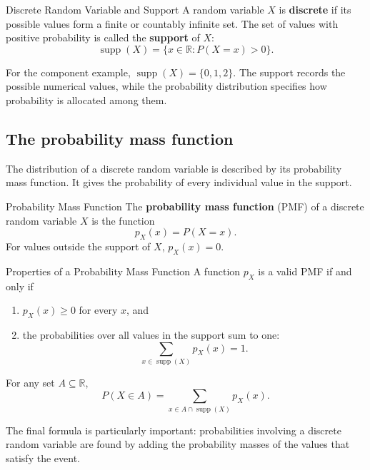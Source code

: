 \begin{definition}{Discrete Random Variable and Support}
    A random variable $X$ is \textbf{discrete} if its possible values form a finite or countably infinite set. The set of values with positive probability is called the \textbf{support} of $X$:
    \[
    \operatorname{supp}(X)=\{x\in\mathbb{R}:P(X=x)>0\}.
    \]
\end{definition}

For the component example, $\operatorname{supp}(X)=\{0,1,2\}$. The support records the possible numerical values, while the probability distribution specifies how probability is allocated among them.

\subsection{The probability mass function}

The distribution of a discrete random variable is described by its probability mass function. It gives the probability of every individual value in the support.

\begin{definition}{Probability Mass Function}
    The \textbf{probability mass function} (PMF) of a discrete random variable $X$ is the function
    \[
    p_X(x)=P(X=x).
    \]
    For values outside the support of $X$, $p_X(x)=0$.
\end{definition}

\clearpage

\begin{theorem}{Properties of a Probability Mass Function}
    A function $p_X$ is a valid PMF if and only if
    \begin{enumerate}
        \item $p_X(x)\geq 0$ for every $x$, and
        \item the probabilities over all values in the support sum to one:
        \[
        \sum_{x\in\operatorname{supp}(X)}p_X(x)=1.
        \]
    \end{enumerate}
    For any set $A\subseteq\mathbb{R}$,
    \[
    P(X\in A)=\sum_{x\in A\cap\operatorname{supp}(X)}p_X(x).
    \]
\end{theorem}

The final formula is particularly important: probabilities involving a discrete random variable are found by adding the probability masses of the values that satisfy the event.

